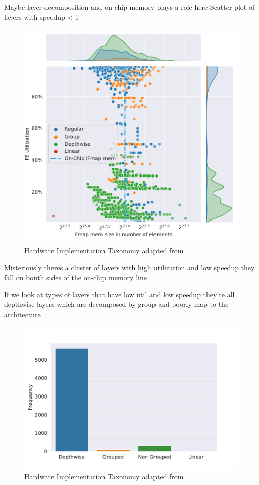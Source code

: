 Maybe layer decomposition and on chip memory plays a role here
Scatter plot of layers with speedup < 1 

\begin{figure}[ht]
    \centering
    \includegraphics[scale=0.58]{Plots/utilization/util_vs_fmap.pdf}
    \caption{Hardware Implementation Taxonomy adapted from \cite{maestro}}
    \label{fig:hw_taxonomy}
\end{figure}


Misteriously theres  a cluster of layers with high utilization and low speedup
they fall on bouth sides of the on-chip memory line

If we look at types of layers that have low util and low speedup they're all
depthwise layers which are decomposed by group and poorly map to the
architecture

\begin{figure}[ht]
    \centering
    \includegraphics[scale=0.58]{Plots/utilization/type_of_low_util.pdf}
    \caption{Hardware Implementation Taxonomy adapted from \cite{maestro}}
    \label{fig:hw_taxonomy}
\end{figure}


